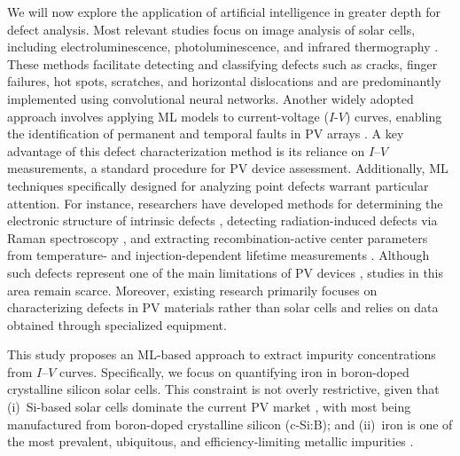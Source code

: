 \documentclass[a4paper,fleqn]{cas-sc}
\begin{document}
We will now explore the application of artificial intelligence in greater depth for defect analysis.
Most relevant studies focus on image analysis of solar cells, including electroluminescence, photoluminescence,
and infrared thermography \cite{AlOtum2024, Pratt2021, Li2024a, Lin2021, Tang2020, Bu2022, Turek2023, Huang2022}.
These methods facilitate detecting and classifying defects such as cracks, finger failures, hot spots, scratches,
and horizontal dislocations and are predominantly implemented using convolutional neural networks.
Another widely adopted approach involves applying ML models to current-voltage ($I$-$V$) curves,
enabling the identification of permanent and temporal faults in PV arrays \cite{Liu2021, Chen2019, Hopwood2020, Mellit2021}.
A key advantage of this defect characterization method is its reliance on $I$–$V$ measurements,
a standard procedure for PV device assessment.
Additionally, ML techniques specifically designed for analyzing point defects warrant particular attention.
For instance, researchers have developed methods for determining
the electronic structure of intrinsic defects \cite{Ma2025, Choudhary2023},
detecting radiation-induced defects via Raman spectroscopy \cite{Park2022,Chia2024},
and extracting recombination-active center parameters from temperature- and injection-dependent
lifetime measurements \cite{Wang2024a, Buratti2022, Buratti2020a}.
Although such defects represent one of the main limitations of PV devices \cite{Le2024, Yamaguchi2018}, studies in this area remain scarce.
Moreover, existing research primarily focuses on characterizing defects in PV materials rather than solar cells and relies on data obtained through specialized equipment.

This study proposes an ML-based approach to extract impurity concentrations from $I$–$V$ curves.
Specifically, we focus on quantifying iron in boron-doped crystalline silicon solar cells.
This constraint is not overly restrictive, given that
(i)~Si-based solar cells dominate the current PV market \cite{Bosnjakovic2024, Zhang2021},
with most being manufactured from boron-doped crystalline silicon (c-Si:B);
and (ii)~iron is one of the most prevalent, ubiquitous, and efficiency-limiting metallic impurities \cite{Buonassisi2006, IronSC}.
\end{document}

